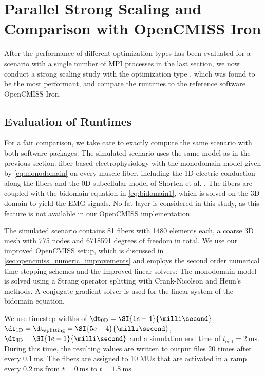 


\section{Parallel Strong Scaling and Comparison with OpenCMISS Iron}\label{sec:parallel_strong_scaling_opencmiss}

After the performance of different optimization types has been evaluated for a scenario with a single number of MPI processes in the last section, we now conduct a strong scaling study with the optimization type , which was found to be the most performant, and compare the runtimes to the reference software OpenCMISS Iron.

\subsection{Evaluation of Runtimes}\label{sec:strong_scaling_runtimes_opencmiss_opendihu}
For a fair comparison, we take care to exactly compute the same scenario with both software packages. The simulated scenario uses the same model as in the previous section: fiber based electrophysiology with the monodomain model given by \cref{eq:monodomain} on every muscle fiber, including the 1D electric conduction along the fibers and the 0D subcellular model of Shorten et al. \cite{Shorten2007}. The fibers are coupled with the bidomain equation in \cref{eq:bidomain1}, which is solved on the 3D domain to yield the EMG signals. No fat layer is considered in this study, as this feature is not available in our OpenCMISS implementation.

The simulated scenario contains 81 fibers with \num{1480} elements each, a coarse 3D mesh with \num{775} nodes and \num{6718591} degrees of freedom in total. 
We use our improved OpenCMISS setup, which is discussed in \cref{sec:opencmiss_numeric_improvements} and employs the second order numerical time stepping schemes and the improved linear solvers:
The monodomain model is solved using a Strang operator splitting with Crank-Nicolson and Heun's methods. A conjugate-gradient solver is used for the linear system of the bidomain equation.

We use timestep widths of $\dt_\text{0D}=\SI{1e-4}{\milli\second}$, $\dt_\text{1D}=\dt_\text{splitting}=\SI{5e-4}{\milli\second}$, $\dt_\text{3D}=\SI{1e-1}{\milli\second}$ and a simulation end time of $t_\text{end}=\SI{2}{\milli\second}$. 
During this time, the resulting values are written to output files 20 times after every $\SI{0.1}{\milli\second}$. 
The fibers are assigned to 10 MUs that are activated in a ramp every $\SI{0.2}{\milli\second}$ from $t=\SI{0}{\milli\second}$ to $t=\SI{1.8}{\milli\second}$.

